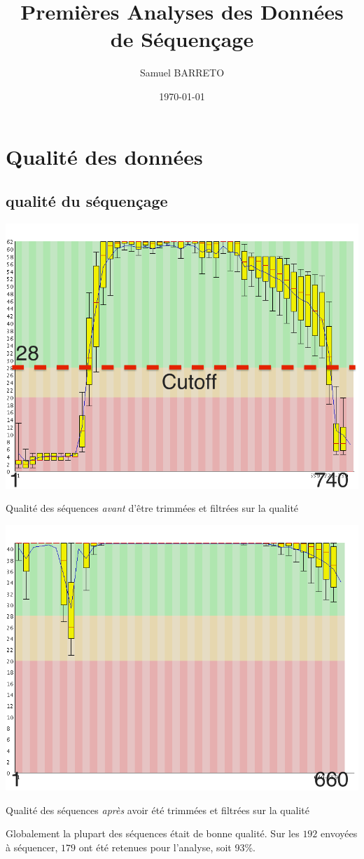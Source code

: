\documentclass[a4paper]{tufte-handout}
\author{Samuel BARRETO}
\date{\today}
\title{Premières Analyses des Données de Séquençage}
\begin{document}
\maketitle

\section{Qualité des données}
\label{sec:orgheadline5}
\subsection{qualité du séquençage}
\label{sec:orgheadline1}
\begin{marginfigure}
  \includegraphics[width=\linewidth]{../untrimmed.png}
  \caption{Qualité des séquences \emph{avant} d'être trimmées et filtrées
      sur la qualité}
\end{marginfigure}

\begin{marginfigure}
  \includegraphics[width=\linewidth]{../trimmed.png}
  \caption{Qualité des séquences \emph{après} avoir été trimmées et filtrées
      sur la qualité}
\end{marginfigure}
Globalement la plupart des séquences était de bonne qualité. Sur les \(192\)
envoyées à séquencer, \(179\) ont été retenues pour l'analyse, soit 93\%.
\end{document}
